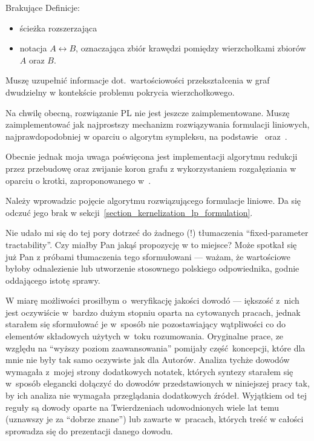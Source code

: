 \begin{note}
  Brakujące Definicje:
  \begin{itemize}
    \item ścieżka rozszerzająca
    \item notacja $A \leftrightarrow B$, oznaczająca zbiór krawędzi pomiędzy
      wierzchołkami zbiorów $A$ oraz $B$.
  \end{itemize}
\end{note}
\begin{note}
  Muszę uzupełnić informacje dot.\ wartościowości przekształcenia w graf
  dwudzielny w kontekście problemu pokrycia wierzchołkowego.
\end{note}
\begin{note}
  Na chwilę obecną, rozwiązanie PL nie jest jeszcze zaimplementowane.
  Muszę zaimplementować jak najprostszy mechanizm rozwiązywania formulacji
  liniowych, najprawdopodobniej w oparciu o algorytm sympleksu, na
  podstawie~\cite{sedgewick11} oraz~\cite{Cormen:2001:IA:580470}.


  Obecnie jednak moja uwaga poświęcona jest implementacji algorytmu redukcji 
  przez przebudowę oraz zwijanie koron grafu z wykorzystaniem rozgałęziania w
  oparciu o krotki, zaproponowanego w~\cite{ImprovedBounds10}. 
\end{note}
\begin{note}
  Należy wprowadzic pojęcie algorytmu rozwiązującego formulacje liniowe. 
  Da się odczuć jego brak w sekcji~\ref{section_kernelization_lp_formulation}.
\end{note}
\begin{note}
  Nie udało mi się do tej pory dotrzeć do żadnego (!) tłumaczenia
  ``fixed-parameter tractability''.
  Czy miałby Pan jakąś propozycję w to miejsce?
  Może spotkał się już Pan z próbami tłumaczenia tego sformułowani --- ważam, że
  wartościowe byłoby odnalezienie lub utworzenie stosownego polskiego
  odpowiednika, godnie oddającego istotę sprawy. 
\end{note}
\begin{note}
  W miarę możliwości prosiłbym o~weryfikację jakości dowodó --- iększość z~nich
  jest oczywiście w~bardzo dużym stopniu oparta na cytowanych pracach, jednak
  starałem się sformułować je w~sposób nie pozostawiający wątpliwości co do
  elementów składowych użytych w~toku rozumowania.
  Oryginalne prace, ze względu na ``wyższy poziom zaawansowania'' pomijały
  część~koncepcji, które dla mnie nie były tak samo oczywiste jak dla Autorów.
  Analiza tychże dowodów wymagała z~mojej strony dodatkowych notatek, których
  syntezy starałem się w~sposób elegancki dołączyć do dowodów przedstawionych w
  niniejszej pracy tak, by ich analiza nie wymagała przeglądania dodatkowych
  źródeł.
  Wyjątkiem od tej reguły są dowody oparte na Twierdzeniach udowodnionych wiele
  lat temu (uznawszy je za ``dobrze znane'') lub zawarte w~pracach, których 
  treść w całości sprowadza się do prezentacji danego dowodu.
\end{note}

